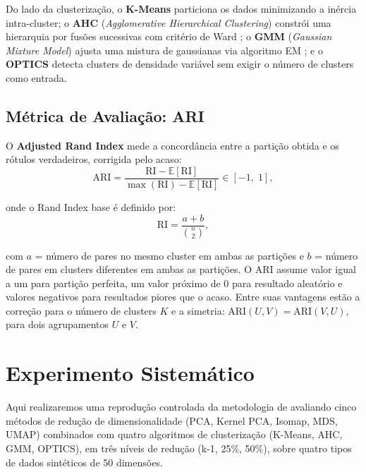 \documentclass[12pt,a4paper]{report}
\begin{document}
Do lado da clusterização, o \textbf{K-Means} \citep{macqueen1967} particiona os
dados minimizando a inércia intra-cluster; o \textbf{AHC}
(\textit{Agglomerative Hierarchical Clustering}) constrói uma hierarquia por
fusões sucessivas com critério de Ward \citep{ward1963}; o \textbf{GMM}
(\textit{Gaussian Mixture Model}) ajusta uma mistura de gaussianas via
algoritmo EM \citep{dempster1977}; e o \textbf{OPTICS} \citep{ankerst1999}
detecta clusters de densidade variável sem exigir o número de clusters como
entrada.

\section{Métrica de Avaliação: ARI}

O \textbf{Adjusted Rand Index} \citep[ARI;][]{hubert1985} mede a
concordância entre a partição obtida e os rótulos verdadeiros, corrigida
pelo acaso:
%
\begin{equation}
  \text{ARI} = \frac{\text{RI} - \mathbb{E}[\text{RI}]}
                    {\max(\text{RI}) - \mathbb{E}[\text{RI}]}
  \in [-1,\; 1],
\end{equation}

onde o Rand Index base é definido por:
%
\begin{equation}
  \text{RI} = \frac{a + b}{\binom{n}{2}},
\end{equation}

com $a$ = número de pares no mesmo cluster em ambas as partições e $b$ =
número de pares em clusters diferentes em ambas as partições. O ARI assume
valor igual a um para partição perfeita, um valor próximo de 0 para
resultado aleatório e valores negativos para resultados piores que o acaso.
Entre suas vantagens estão a correção para o número de clusters $K$ e a
simetria: $\text{ARI}(U, V) = \text{ARI}(V, U)$, para dois agrupamentos
$U$ e $V$.

\chapter{Experimento Sistemático}
\label{chap:experimento}

Aqui realizaremos uma reprodução controlada da metodologia de \citet{amate2026} avaliando cinco métodos de redução de dimensionalidade (PCA, Kernel PCA, Isomap, MDS, UMAP) combinados com quatro algoritmos de
clusterização (K-Means, AHC, GMM, OPTICS), em três níveis de redução (k-1, 25\%, 50\%), sobre quatro tipos de dados sintéticos de 50 dimensões.
\end{document}
